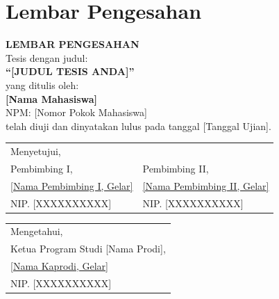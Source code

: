 
\chapter*{Lembar Pengesahan}

\begin{center}
{\large\bfseries LEMBAR PENGESAHAN}\\[1cm]

Tesis dengan judul:\\[0.3cm]
{\bfseries ``[JUDUL TESIS ANDA]''}\\[0.3cm]
yang ditulis oleh:\\[0.3cm]
{\bfseries [Nama Mahasiswa]}\\
NPM: [Nomor Pokok Mahasiswa]\\[1cm]

telah diuji dan dinyatakan lulus pada tanggal [Tanggal Ujian].
\end{center}

\vspace{1.5cm}

\noindent
\begin{tabular}{p{6.5cm}p{6.5cm}}
Menyetujui, & \\[0.3cm]
Pembimbing I, & Pembimbing II, \\[2.5cm]
\underline{[Nama Pembimbing I, Gelar]} & \underline{[Nama Pembimbing II, Gelar]} \\
NIP. [XXXXXXXXXX] & NIP. [XXXXXXXXXX] \\
\end{tabular}

\vspace{1.5cm}

\noindent
\begin{tabular}{p{13.5cm}}
Mengetahui, \\[0.3cm]
Ketua Program Studi [Nama Prodi], \\[2.5cm]
\underline{[Nama Kaprodi, Gelar]} \\
NIP. [XXXXXXXXXX] \\
\end{tabular}

\clearpage
